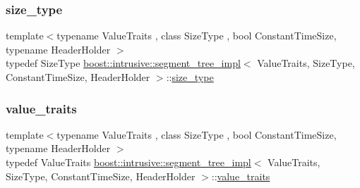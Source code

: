 \mbox{\label{classboost_1_1intrusive_1_1segment__tree__impl_ad11efa20e1eb479bc39e13ea312ca088}} 
\subsubsection{\texorpdfstring{size\+\_\+type}{size\_type}}
{\footnotesize\ttfamily template$<$typename Value\+Traits , class Size\+Type , bool Constant\+Time\+Size, typename Header\+Holder $>$ \\
typedef Size\+Type \hyperlink{classboost_1_1intrusive_1_1segment__tree__impl}{boost\+::intrusive\+::segment\+\_\+tree\+\_\+impl}$<$ Value\+Traits, Size\+Type, Constant\+Time\+Size, Header\+Holder $>$\+::\hyperlink{classboost_1_1intrusive_1_1segment__tree__impl_ad11efa20e1eb479bc39e13ea312ca088}{size\+\_\+type}}

\mbox{\label{classboost_1_1intrusive_1_1segment__tree__impl_a929c1b3f1e6bb851a911b9b54a4c0dc2}} 
\subsubsection{\texorpdfstring{value\+\_\+traits}{value\_traits}}
{\footnotesize\ttfamily template$<$typename Value\+Traits , class Size\+Type , bool Constant\+Time\+Size, typename Header\+Holder $>$ \\
typedef Value\+Traits \hyperlink{classboost_1_1intrusive_1_1segment__tree__impl}{boost\+::intrusive\+::segment\+\_\+tree\+\_\+impl}$<$ Value\+Traits, Size\+Type, Constant\+Time\+Size, Header\+Holder $>$\+::\hyperlink{classboost_1_1intrusive_1_1segment__tree__impl_a929c1b3f1e6bb851a911b9b54a4c0dc2}{value\+\_\+traits}}

\mbox{\label{classboost_1_1intrusive_1_1segment__tree__impl_ab1fd253eacbcdbacb8e5e73fc580626d}} 
